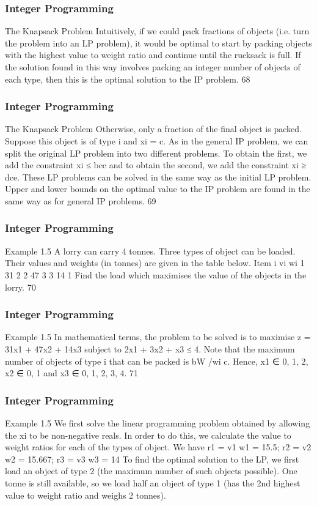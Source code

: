 \begin{frame} 
	\frametitle{Integer Programming}     
The Knapsack Problem
Intuitively, if we could pack fractions of objects (i.e. turn the
problem into an LP problem), it would be optimal to start by
packing objects with the highest value to weight ratio and continue
until the rucksack is full.
If the solution found in this way involves packing an integer
number of objects of each type, then this is the optimal solution to
the IP problem.
68
\end{frame}  
\begin{frame} 
\frametitle{Integer Programming}     
The Knapsack Problem
Otherwise, only a fraction of the final object is packed.
Suppose this object is of type i and xi = c. As in the general IP
problem, we can split the original LP problem into two different
problems. To obtain the first, we add the constraint xi ≤ bcc and
to obtain the second, we add the constraint xi ≥ dce.
These LP problems can be solved in the same way as the initial LP
problem.
Upper and lower bounds on the optimal value to the IP problem
are found in the same way as for general IP problems.
69 \end{frame}  
\begin{frame} \frametitle{Integer Programming}     
Example 1.5
A lorry can carry 4 tonnes. Three types of object can be loaded.
Their values and weights (in tonnes) are given in the table below.
Item i vi wi
1 31 2
2 47 3
3 14 1
Find the load which maximises the value of the objects in the lorry.
70 \end{frame}  \begin{frame} \frametitle{Integer Programming}     
Example 1.5
In mathematical terms, the problem to be solved is to maximise
z = 31x1 + 47x2 + 14x3
subject to
2x1 + 3x2 + x3 ≤ 4.
Note that the maximum number of objects of type i that can be
packed is bW /wi c.
Hence, x1 ∈ {0, 1, 2}, x2 ∈ {0, 1} and x3 ∈ {0, 1, 2, 3, 4}.
71 \end{frame}  \begin{frame} \frametitle{Integer Programming}     
Example 1.5
We first solve the linear programming problem obtained by
allowing the xi to be non-negative reals.
In order to do this, we calculate the value to weight ratios for each
of the types of object. We have
r1 =
v1
w1
= 15.5; r2 =
v2
w2
= 15.667; r3 =
v3
w3
= 14
To find the optimal solution to the LP, we first load an object of
type 2 (the maximum number of such objects possible).
One tonne is still available, so we load half an object of type 1 (has
the 2nd highest value to weight ratio and weighs 2 tonnes).
\end{frame}  
